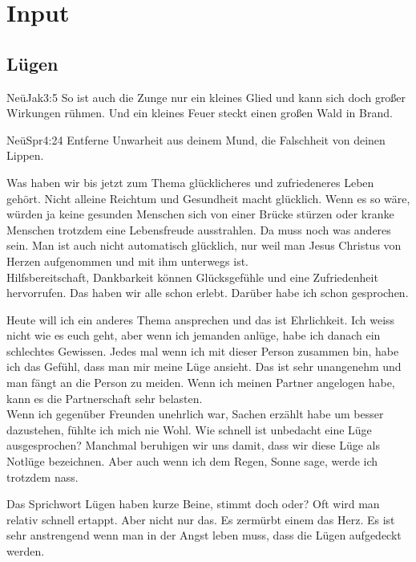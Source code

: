 \documentclass{../inc/mybib}
\begin{document}
\section{ Input }
\begin{spacing}{1.5}
\subsection{Lügen}

\begin{bibeltext}{Neü}{Jak}{3:5}
So ist auch die Zunge nur ein kleines Glied und kann sich doch großer Wirkungen rühmen. Und ein kleines Feuer steckt einen großen Wald in Brand.
\end{bibeltext}
\begin{bibeltext}{Neü}{Spr}{4:24}
Entferne Unwarheit aus deinem Mund, die Falschheit von deinen Lippen.
\end{bibeltext}

Was haben wir bis jetzt zum Thema glücklicheres und zufriedeneres Leben gehört. Nicht alleine Reichtum und Gesundheit macht glücklich. Wenn es so wäre, würden ja keine gesunden Menschen sich von einer Brücke stürzen oder kranke Menschen trotzdem eine Lebensfreude ausstrahlen. Da muss noch was anderes sein. Man ist auch nicht automatisch glücklich, nur weil man Jesus Christus von Herzen aufgenommen und mit ihm unterwegs ist.\\
Hilfsbereitschaft, Dankbarkeit können Glücksgefühle und eine Zufriedenheit hervorrufen. Das haben wir alle schon erlebt. Darüber habe ich schon gesprochen.

Heute will ich ein anderes Thema ansprechen und das ist Ehrlichkeit. Ich weiss nicht wie es euch geht, aber wenn ich jemanden anlüge, habe ich danach ein schlechtes Gewissen. Jedes mal wenn ich mit dieser Person zusammen bin, habe ich das Gefühl, dass man mir meine Lüge ansieht. Das ist sehr unangenehm und man fängt an die Person zu meiden. Wenn ich meinen Partner angelogen habe, kann es die Partnerschaft sehr belasten.\\
Wenn ich gegenüber Freunden unehrlich war, Sachen erzählt habe um besser dazustehen, fühlte ich mich nie Wohl. Wie schnell ist unbedacht eine Lüge ausgesprochen? Manchmal beruhigen wir uns damit, dass wir diese Lüge als Notlüge bezeichnen. Aber auch wenn ich dem Regen, Sonne sage, werde ich trotzdem nass.

Das Sprichwort Lügen haben kurze Beine, stimmt doch oder? Oft wird man relativ schnell ertappt. Aber nicht nur das. Es zermürbt einem das Herz. Es ist sehr anstrengend wenn man in der Angst leben muss, dass die Lügen aufgedeckt werden.


\end{spacing}
\end{document}
